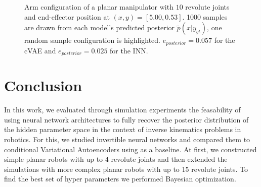 \documentclass[conference]{IEEEtran}
\begin{document}
\begin{figure}[tbh]
\centering

    \caption{\label{fig:posterior:10dof} Arm configuration of a planar manipulator with $10$ revolute joints and end-effector position at $(x, y) = [5.00, 0.53]$. 1000 samples are drawn from each model's predicted posterior $\tilde{p}(x | y_{gt})$, one random sample configuration is highlighted. $e_{posterior} = 0.057$ for the cVAE and $e_{posterior} = 0.025$ for the INN.}
\end{figure}

\section*{Conclusion}

In this work, we evaluated through simulation experiments the feasability of using neural network architectures to fully recover the posterior distribution of the hidden parameter space in the context of inverse kinematics problems in robotics. For this, we studied invertible neural networks and compared them to conditional Variational Autoencoders using as a baseline. At first, we constructed simple planar robots with up to 4 revolute joints and then extended the simulations with more complex planar robots with up to 15 revolute joints. To find the best set of hyper parameters we performed Bayesian optimization.
\end{document}
